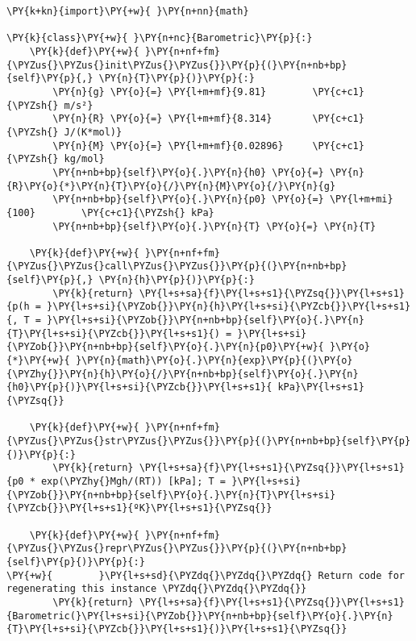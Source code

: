 \begin{tcolorbox}[breakable, size=fbox, boxrule=1pt, pad at break*=1mm,colback=cellbackground, colframe=cellborder]
\begin{Verbatim}[commandchars=\\\{\}]
\PY{k+kn}{import}\PY{+w}{ }\PY{n+nn}{math} 

\PY{k}{class}\PY{+w}{ }\PY{n+nc}{Barometric}\PY{p}{:}
    \PY{k}{def}\PY{+w}{ }\PY{n+nf+fm}{\PYZus{}\PYZus{}init\PYZus{}\PYZus{}}\PY{p}{(}\PY{n+nb+bp}{self}\PY{p}{,} \PY{n}{T}\PY{p}{)}\PY{p}{:}
        \PY{n}{g} \PY{o}{=} \PY{l+m+mf}{9.81}        \PY{c+c1}{\PYZsh{} m/s²}
        \PY{n}{R} \PY{o}{=} \PY{l+m+mf}{8.314}       \PY{c+c1}{\PYZsh{} J/(K*mol)}
        \PY{n}{M} \PY{o}{=} \PY{l+m+mf}{0.02896}     \PY{c+c1}{\PYZsh{} kg/mol}
        \PY{n+nb+bp}{self}\PY{o}{.}\PY{n}{h0} \PY{o}{=} \PY{n}{R}\PY{o}{*}\PY{n}{T}\PY{o}{/}\PY{n}{M}\PY{o}{/}\PY{n}{g}
        \PY{n+nb+bp}{self}\PY{o}{.}\PY{n}{p0} \PY{o}{=} \PY{l+m+mi}{100}        \PY{c+c1}{\PYZsh{} kPa}
        \PY{n+nb+bp}{self}\PY{o}{.}\PY{n}{T} \PY{o}{=} \PY{n}{T}

    \PY{k}{def}\PY{+w}{ }\PY{n+nf+fm}{\PYZus{}\PYZus{}call\PYZus{}\PYZus{}}\PY{p}{(}\PY{n+nb+bp}{self}\PY{p}{,} \PY{n}{h}\PY{p}{)}\PY{p}{:}
        \PY{k}{return} \PY{l+s+sa}{f}\PY{l+s+s1}{\PYZsq{}}\PY{l+s+s1}{p(h = }\PY{l+s+si}{\PYZob{}}\PY{n}{h}\PY{l+s+si}{\PYZcb{}}\PY{l+s+s1}{, T = }\PY{l+s+si}{\PYZob{}}\PY{n+nb+bp}{self}\PY{o}{.}\PY{n}{T}\PY{l+s+si}{\PYZcb{}}\PY{l+s+s1}{) = }\PY{l+s+si}{\PYZob{}}\PY{n+nb+bp}{self}\PY{o}{.}\PY{n}{p0}\PY{+w}{ }\PY{o}{*}\PY{+w}{ }\PY{n}{math}\PY{o}{.}\PY{n}{exp}\PY{p}{(}\PY{o}{\PYZhy{}}\PY{n}{h}\PY{o}{/}\PY{n+nb+bp}{self}\PY{o}{.}\PY{n}{h0}\PY{p}{)}\PY{l+s+si}{\PYZcb{}}\PY{l+s+s1}{ kPa}\PY{l+s+s1}{\PYZsq{}}
    
    \PY{k}{def}\PY{+w}{ }\PY{n+nf+fm}{\PYZus{}\PYZus{}str\PYZus{}\PYZus{}}\PY{p}{(}\PY{n+nb+bp}{self}\PY{p}{)}\PY{p}{:}
        \PY{k}{return} \PY{l+s+sa}{f}\PY{l+s+s1}{\PYZsq{}}\PY{l+s+s1}{p0 * exp(\PYZhy{}Mgh/(RT)) [kPa]; T = }\PY{l+s+si}{\PYZob{}}\PY{n+nb+bp}{self}\PY{o}{.}\PY{n}{T}\PY{l+s+si}{\PYZcb{}}\PY{l+s+s1}{ºK}\PY{l+s+s1}{\PYZsq{}}

    \PY{k}{def}\PY{+w}{ }\PY{n+nf+fm}{\PYZus{}\PYZus{}repr\PYZus{}\PYZus{}}\PY{p}{(}\PY{n+nb+bp}{self}\PY{p}{)}\PY{p}{:}
\PY{+w}{        }\PY{l+s+sd}{\PYZdq{}\PYZdq{}\PYZdq{} Return code for regenerating this instance \PYZdq{}\PYZdq{}\PYZdq{}}
        \PY{k}{return} \PY{l+s+sa}{f}\PY{l+s+s1}{\PYZsq{}}\PY{l+s+s1}{Barometric(}\PY{l+s+si}{\PYZob{}}\PY{n+nb+bp}{self}\PY{o}{.}\PY{n}{T}\PY{l+s+si}{\PYZcb{}}\PY{l+s+s1}{)}\PY{l+s+s1}{\PYZsq{}}
\end{Verbatim}
\end{tcolorbox}

